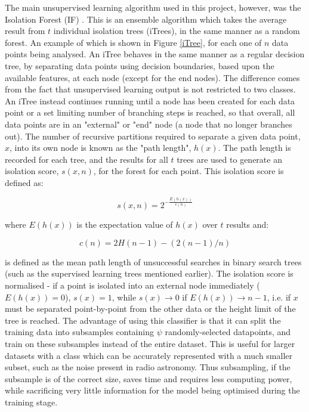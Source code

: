 \documentclass[12pt]{article}
\begin{document}
The main unsupervised learning algorithm used in this project, however, was the Isolation Forest (IF) \cite{liu2008isolation}. This is an ensemble algorithm which takes the average result from $t$ individual isolation trees (iTrees), in the same manner as a random forest. An example of which is shown in Figure \ref{iTree}, for each one of $n$ data points being analysed. An iTree behaves in the same manner as a regular decision tree, by separating data points using decision boundaries, based upon the available features, at each node (except for the end nodes). The difference comes from the fact that unsupervised learning output is not restricted to two classes. An iTree instead continues running until a node has been created for each data point or a set limiting number of branching steps is reached, so that overall, all data points are in an "external" or "end" node (a node that no longer branches out). The number of recursive partitions required to separate a given data point, $x$, into its own node is known as the "path length", $h(x)$. The path length is recorded for each tree, and the results for all $t$ trees are used to generate an isolation score, $s(x,n)$, for the forest for each point. This isolation score is defined as:

\begin{equation}
s(x,n) = 2^{-\frac{E(h(x))}{c(n)}}
\label{itreescore}
\end{equation}

where $E(h(x))$ is the expectation value of $h(x)$ over $t$ results and:

\begin{equation}
c(n) = 2H(n − 1) − (2(n − 1)/n)
\label{plmean}
\end{equation}

is defined as the mean path length of unsuccessful searches in binary search trees \cite{liu2008isolation} (such as the supervised learning trees mentioned earlier). The isolation score is normalised - if a point is isolated into an external node immediately ($E(h(x)) = 0$), $s(x) = 1$, while $s(x) \to 0$ if $ E(h(x)) \to n-1 $, i.e. if $x$ must be separated point-by-point from the other data or the height limit of the tree is reached. The advantage of using this classifier is that it can split the training data into subsamples containing $\psi$ randomly-selected datapoints, and train on these subsamples instead of the entire dataset. This is useful for larger datasets with a class which can be accurately represented with a much smaller subset, such as the noise present in radio astronomy. Thus subsampling, if the subsample is of the correct size, saves time and requires less computing power, while sacrificing very little information for the model being optimised during the training stage.
\end{document}
